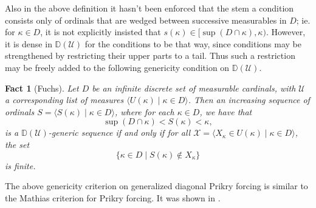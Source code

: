 \documentclass{amsart}
\newtheorem{fact}[theorem]{Fact}
\theoremstyle{definition}
\theoremstyle{remark}
\newcommand{\D}{\mathbb{D}}
\newcommand{\U}{\mathcal{U}}
\begin{document}
Also in the above definition it hasn't been enforced that the stem a condition consists only of ordinals that are wedged between successive measurables in $D$; ie. for $\kappa \in D$, it is not explicitly insisted that $s(\kappa) \in [\sup(D\cap \kappa), \kappa)$. However, it is dense in $\D(\U)$ for the conditions to be that way, since conditions may be strengthened by restricting their upper parts to a tail. Thus such a restriction may be freely added to the following genericity condition on $\D(\U)$.

\begin{fact}[Fuchs] \label{fact:diagprikrymathias} Let $D$ be an infinite discrete set of measurable cardinals, with $\U$ a corresponding list of measures $\langle U(\kappa) \;|\; \kappa \in D \rangle$. Then an increasing sequence of ordinals $S = \langle S(\kappa) \;|\; \kappa \in D \rangle$, where for each $\kappa \in D$, we have that $$\sup(D \cap \kappa) < S(\kappa) < \kappa,$$ is a $\D(\U)$-generic  sequence if and only if for all $\mathcal X = \langle X_\kappa \in U(\kappa) \;|\; \kappa \in D \rangle$, the set $$\{ \kappa \in D \;|\; S(\kappa) \notin X_\kappa\}$$ is finite.
\end{fact}

The above genericity criterion on generalized diagonal Prikry forcing is similar to the Mathias criterion for Prikry forcing. It was shown in \cite[Theorem 1]{Fuchs:2005kx}. 
\end{document}
